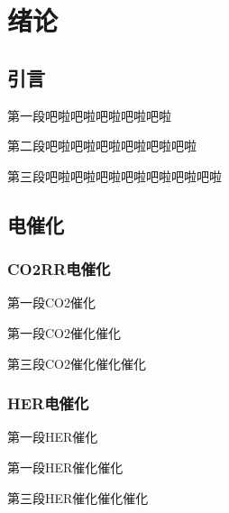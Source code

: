 \chapter{绪论}

\section{引言}

第一段吧啦吧啦吧啦吧啦吧啦

第二段吧啦吧啦吧啦吧啦吧啦吧啦

第三段吧啦吧啦吧啦吧啦吧啦吧啦吧啦

\section{电催化}

\subsection{CO2RR电催化}

第一段CO2催化

第一段CO2催化催化

第三段CO2催化催化催化

\subsection{HER电催化}

第一段HER催化

第一段HER催化催化

第三段HER催化催化催化

